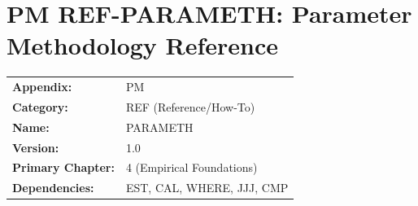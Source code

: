 %
%

\chapter{PM REF-PARAMETH: Parameter Methodology Reference}
\label{app:ref-pm}


\begin{tcolorbox}[colback=white, colframe=black!50, title=Appendix Information]
\begin{tabular}{ll}
\textbf{Appendix:} & PM \\
\textbf{Category:} & REF (Reference/How-To) \\
\textbf{Name:} & PARAMETH \\
\textbf{Version:} & 1.0 \\
\textbf{Primary Chapter:} & 4 (Empirical Foundations) \\
\textbf{Dependencies:} & EST, CAL, WHERE, JJJ, CMP \\
\end{tabular}
\end{tcolorbox}

